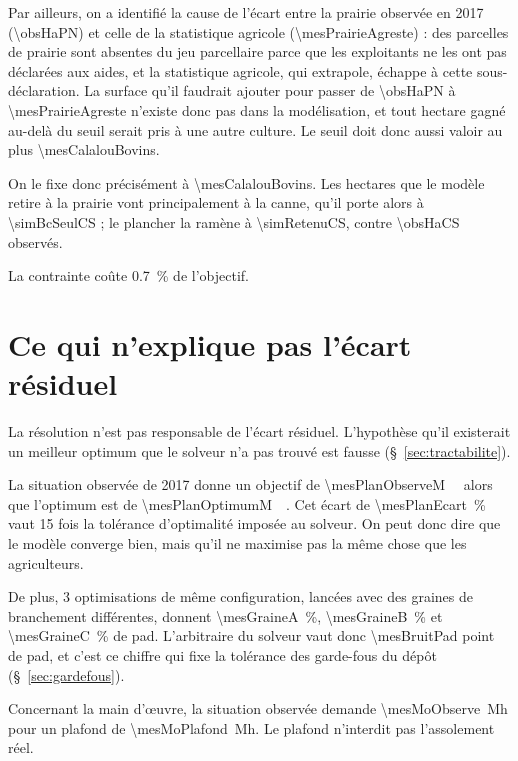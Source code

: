 Par ailleurs, on a identifié la cause de l'écart entre la prairie observée en 2017
(\SI{\obsHaPN}{\ha}) et celle de la statistique agricole (\SI{\mesPrairieAgreste}{\ha}) : des
parcelles de prairie sont absentes du jeu parcellaire parce que les exploitants ne les ont pas
déclarées aux aides, et la statistique agricole, qui extrapole, échappe à cette
sous-déclaration. La surface qu'il faudrait ajouter pour passer de \SI{\obsHaPN}{\ha} à
\SI{\mesPrairieAgreste}{\ha} n'existe donc pas dans la modélisation, et tout hectare gagné
au-delà du seuil serait pris à une autre culture. Le seuil doit donc aussi valoir au plus
\SI{\mesCalalouBovins}{\ha}.

On le fixe donc précisément à \SI{\mesCalalouBovins}{\ha}. Les hectares que le modèle retire à
la prairie vont principalement à la canne, qu'il porte alors à \SI{\simBcSeulCS}{\ha} ; le
plancher la ramène à \SI{\simRetenuCS}{\ha}, contre \SI{\obsHaCS}{\ha} observés.

La contrainte coûte \SI{0.7}{\percent} de l'objectif.

\section{Ce qui n'explique pas l'écart résiduel}
\label{sec:plateau}

La résolution n'est pas responsable de l'écart résiduel. L'hypothèse qu'il existerait un
meilleur optimum que le solveur n'a pas trouvé est fausse (§~\ref{sec:tractabilite}).

La situation observée de 2017 donne un objectif de \SI{\mesPlanObserveM}{\mega\euros} alors que
l'optimum est de \SI{\mesPlanOptimumM}{\mega\euros}. Cet écart de \SI{\mesPlanEcart}{\percent}
vaut \num{15} fois la tolérance d'optimalité imposée au solveur. On peut donc dire que le modèle
converge bien, mais qu'il ne maximise pas la même chose que les agriculteurs.

De plus, \num{3} optimisations de même configuration, lancées avec des graines de branchement
différentes, donnent \SI{\mesGraineA}{\percent}, \SI{\mesGraineB}{\percent} et
\SI{\mesGraineC}{\percent} de \gls{pad}. L'arbitraire du solveur vaut donc \num{\mesBruitPad}
point de \gls{pad}, et c'est ce chiffre qui fixe la tolérance des garde-fous du dépôt
(§~\ref{sec:gardefous}).

Concernant la main d'\oe uvre, la situation observée demande \SI{\mesMoObserve}{\mega\hour} pour
un plafond de \SI{\mesMoPlafond}{\mega\hour}. Le plafond n'interdit pas l'assolement réel.

